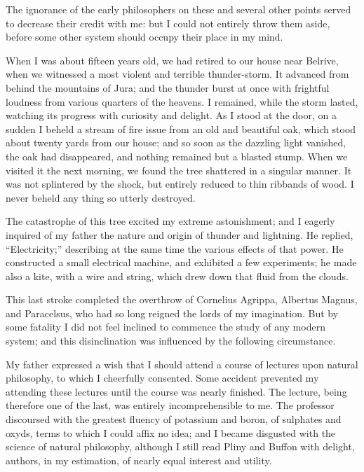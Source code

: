 The ignorance of the early philosophers
on these and several other points
served to decrease their credit with me:
but I could not entirely throw them
aside, before some other system should
occupy their place in my mind.

When I was about fifteen years old,
we had retired to our house near Belrive,
when we witnessed a most violent
and terrible thunder-storm. It advanced
from behind the mountains of Jura; and
the thunder burst at once with frightful
loudness from various quarters of the
heavens. I remained, while the storm
lasted, watching its progress with curiosity
and delight. As I stood at the
door, on a sudden I beheld a stream of
fire issue from an old and beautiful oak,
which stood about twenty yards from
our house; and so soon as the dazzling
light vanished, the oak had disappeared,
and nothing remained but a blasted
stump. When we visited it the next
morning, we found the tree shattered
in a singular manner. It was not splintered
by the shock, but entirely reduced
to thin ribbands of wood. I never beheld
any thing so utterly destroyed.

The catastrophe of this tree excited
my extreme astonishment; and I eagerly
inquired of my father the nature
and origin of thunder and lightning.
He replied, ``Electricity;'' describing
at the same time the various effects of
that power. He constructed a small
electrical machine, and exhibited a few
experiments; he made also a kite, with
a wire and string, which drew down
that fluid from the clouds.

This last stroke completed the overthrow
of Cornelius Agrippa, Albertus
Magnus, and Paracelsus, who had so
long reigned the lords of my imagination.
But by some fatality I did not
feel inclined to commence the study of
any modern system; and this disinclination
was influenced by the following
circumstance.

My father expressed a wish that I
should attend a course of lectures upon
natural philosophy, to which I cheerfully
consented. Some accident prevented
my attending these lectures
until the course was nearly finished.
The lecture, being therefore one of the
last, was entirely incomprehensible to
me. The professor discoursed with
the greatest fluency of potassium and
boron, of sulphates and oxyds, terms
to which I could affix no idea; and I
became disgusted with the science of
natural philosophy, although I still read
Pliny and Buffon with delight, authors,
in my estimation, of nearly equal interest
and utility.

